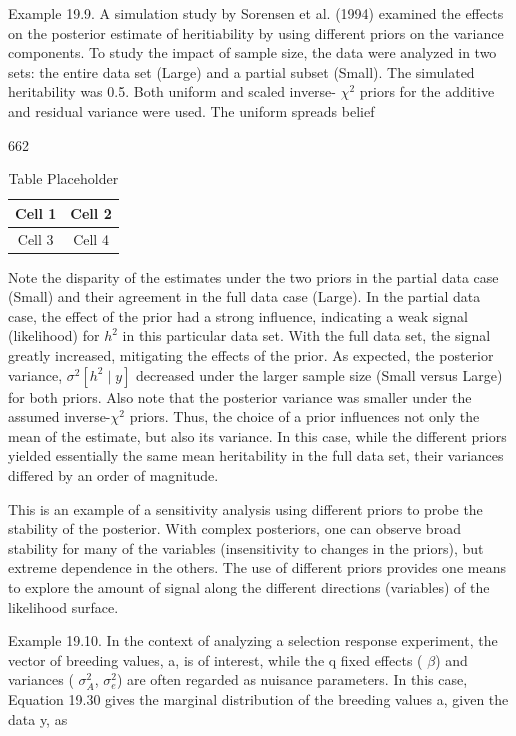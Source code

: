 \documentclass{article}
\begin{document}
Example 19.9. A simulation study by Sorensen et al. (1994) examined the effects on the posterior estimate of heritiability by using different priors on the variance components. To study the impact of sample size, the data were analyzed in two sets: the entire data set (Large) and a partial subset (Small). The simulated heritability was 0.5. Both uniform and scaled inverse- $ \chi^{2} $ priors for the additive and residual variance were used. The uniform spreads belief

662

\begin{table}[h]
\centering
\begin{tabular}{|c|c|}
\hline
Cell 1 & Cell 2 \\
\hline
Cell 3 & Cell 4 \\
\hline
\end{tabular}
\caption{Table Placeholder}
\end{table}

Note the disparity of the estimates under the two priors in the partial data case (Small) and their agreement in the full data case (Large). In the partial data case, the effect of the prior had a strong influence, indicating a weak signal (likelihood) for $h^2$ in this particular data set. With the full data set, the signal greatly increased, mitigating the effects of the prior. As expected, the posterior variance, $\sigma^2[h^2 \mid y]$ decreased under the larger sample size (Small versus Large) for both priors. Also note that the posterior variance was smaller under the assumed inverse-$\chi^2$ priors. Thus, the choice of a prior influences not only the mean of the estimate, but also its variance. In this case, while the different priors yielded essentially the same mean heritability in the full data set, their variances differed by an order of magnitude.

This is an example of a sensitivity analysis using different priors to probe the stability of the posterior. With complex posteriors, one can observe broad stability for many of the variables (insensitivity to changes in the priors), but extreme dependence in the others. The use of different priors provides one means to explore the amount of signal along the different directions (variables) of the likelihood surface.

Example 19.10. In the context of analyzing a selection response experiment, the vector of breeding values, a, is of interest, while the q fixed effects ( $ \beta $) and variances ( $ \sigma_A^2 $,  $ \sigma_e^2 $) are often regarded as nuisance parameters. In this case, Equation 19.30 gives the marginal distribution of the breeding values a, given the data y, as
\end{document}
